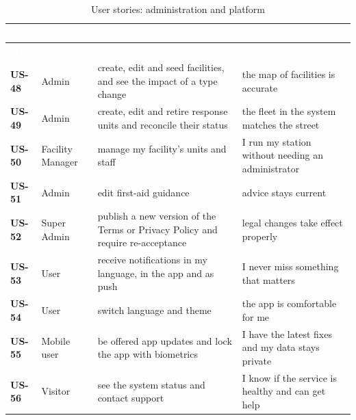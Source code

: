 {\tabfont\rowband
\begin{longtable}{@{}>{\raggedright\arraybackslash}p{}>{\raggedright\arraybackslash}p{}>{\raggedright\arraybackslash}p{}>{\raggedright\arraybackslash}p{}@{}}
\caption{User stories: administration and platform}\label{tab:us-adm}\\
\rowcolor{najdanavy}\textcolor{white}{\sffamily\bfseries\small ID} & \textcolor{white}{\sffamily\bfseries\small As a\ldots{}} & \textcolor{white}{\sffamily\bfseries\small I want to\ldots{}} & \textcolor{white}{\sffamily\bfseries\small So that\ldots{}}\\
\endfirsthead
\rowcolor{najdanavy}\textcolor{white}{\sffamily\bfseries\small ID} & \textcolor{white}{\sffamily\bfseries\small As a\ldots{}} & \textcolor{white}{\sffamily\bfseries\small I want to\ldots{}} & \textcolor{white}{\sffamily\bfseries\small So that\ldots{}}\\
\endhead
\bottomrule\endlastfoot
\textbf{US-48} & Admin & create, edit and seed facilities, and see the impact of a type change & the map of facilities is accurate\\
\textbf{US-49} & Admin & create, edit and retire response units and reconcile their status & the fleet in the system matches the street\\
\textbf{US-50} & Facility Manager & manage my facility’s units and staff & I run my station without needing an administrator\\
\textbf{US-51} & Admin & edit first-aid guidance & advice stays current\\
\textbf{US-52} & Super Admin & publish a new version of the Terms or Privacy Policy and require re-acceptance & legal changes take effect properly\\
\textbf{US-53} & User & receive notifications in my language, in the app and as push & I never miss something that matters\\
\textbf{US-54} & User & switch language and theme & the app is comfortable for me\\
\textbf{US-55} & Mobile user & be offered app updates and lock the app with biometrics & I have the latest fixes and my data stays private\\
\textbf{US-56} & Visitor & see the system status and contact support & I know if the service is healthy and can get help\\
\end{longtable}}
